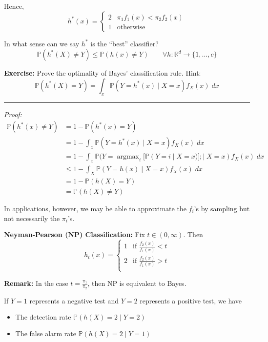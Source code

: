 \documentclass[12pt]{report}
\renewcommand{\P}{\mathbb{P}}
\newcommand{\R}{\mathbb{R}}
\renewcommand{\div}{\vspace*{10pt}\hrule\vspace*{10pt}}
\newcommand*{\tbf}[1]{\ifmmode\mathbf{#1}\else\textbf{#1}\fi}
\DeclareMathOperator*{\argmax}{\arg\max}
\newenvironment*{exercise}[1][red]{
    \begin{tcolorbox}[
        parbox=false,
        colback=#1!5!white,
        colframe=#1!75!black,
        breakable
    ]}
    {\end{tcolorbox}}
\newenvironment*{proposition}[1][gray]{
\begin{tcolorbox}[
    parbox=false,
    colback=#1!5!white,
    colframe=#1!75!black,
    breakable
]}
{\end{tcolorbox}}
\begin{document}
Hence,
\[h^*(x) = \begin{cases}
		2 & \pi_1 f_1(x) < \pi_2 f_2(x) \\
		1 & \text{otherwise}
	\end{cases}\]

In what sense can we say $h^*$ is the ``best'' classifier?
\[\P(h^*(X) \neq Y) \leq \P(h(x) \neq Y) \qquad \forall h: \R^d \to \{1, \dots, c\}\]

\begin{exercise}
	\textbf{Exercise:} Prove the optimality of Bayes' classification rule. Hint:
	\[\P(h^*(X) = Y) = \int_x \P(Y = h^*(x) \; | \; X = x) f_X(x)\; dx\]

	\div

	\emph{Proof:}
	\begin{align*}
		\P(h^*(x) \neq Y) & = 1 - \P(h^*(x) = Y)                                                             \\
		                  & = 1 - \int_x \P(Y = h^*(x) \; | \; X = x) f_X(x)\; dx                            \\
		                  & = 1 - \int_x \P(Y = \argmax_i [\P(Y = i \; | \; X = x)]; | \; X = x) f_X(x)\; dx \\
		                  & \leq 1 - \int_X \P(Y = h(x) \; | \;X = x) f_X(x)\; dx                            \\
		                  & = 1 - \P(h(X) = Y)                                                               \\
		                  & = \P(h(X) \neq Y)
	\end{align*}
\end{exercise}


In applications, however, we may be able to approximate the $f_i$'s by sampling but not necessarily the $\pi_i$'s.

\begin{proposition}
	\textbf{Neyman-Pearson (NP) Classification:} Fix $t \in (0, \infty)$. Then
	\[h_t(x) = \begin{cases}
			1 & \text{if } \frac{f_2(x)}{f_1(x)} < t \\
			2 & \text{if } \frac{f_2(x)}{f_1(x)} > t \\
		\end{cases}\]
\end{proposition}

\tbf{Remark:} In the case $t = \frac{\pi_1}{\pi_2}$, then NP is equivalent to Bayes.

If $Y = 1$ represents a negative test and $Y = 2$ represents a positive test, we have
\begin{itemize}
	\item The detection rate $\P(h(X) = 2 \; | \; Y = 2)$
	\item The false alarm rate $\P(h(X) = 2 \; | \; Y = 1)$
\end{itemize}
\end{document}
